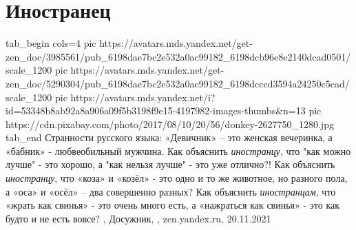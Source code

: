  
 
 
 
 
\chapter{Иностранец}


\ifcmt
  tab_begin cols=4
     pic https://avatars.mds.yandex.net/get-zen_doc/3985561/pub_6198dae7bc2e532a0ac99182_6198dcb96e8e2140dcad0501/scale_1200
     pic https://avatars.mds.yandex.net/get-zen_doc/5290304/pub_6198dae7bc2e532a0ac99182_6198dcccd3594a24250c5cad/scale_1200
		 pic https://avatars.mds.yandex.net/i?id=53348b8ab92a8a906a09f5b3198f9e15-4197982-images-thumbs&n=13
		 pic https://cdn.pixabay.com/photo/2017/08/10/20/56/donkey-2627750_1280.jpg
  tab_end
\fi
Странности русского языка: «Девичник» – это женская вечеринка, а «бабник» -
любвеобильный мужчина.  Как объяснить \emph{иностранцу}, что "как можно лучше"
- это хорошо, а "как нельзя лучше" - это уже отлично?!  Как объяснить
\emph{иностранцу}, что «коза» и «козёл» - это одно и то же животное, но разного
пола, а «оса» и «осёл» – два совершенно разных?  Как объяснить
\emph{иностранцам}, что «жрать как свинья» - это очень много есть, а «нажраться
как свинья» - это как будто и не есть вовсе?
, Досужник, %
, zen.yandex.ru, 20.11.2021
